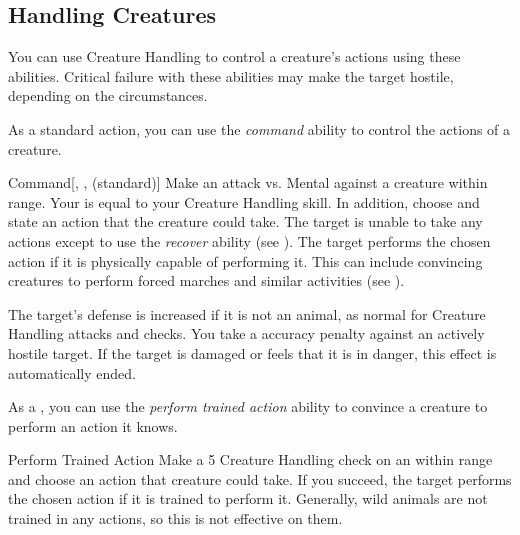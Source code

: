     \subsection{Handling Creatures}
        You can use Creature Handling to control a creature's actions using these abilities.
        Critical failure with these abilities may make the target hostile, depending on the circumstances.

        As a standard action, you can use the \textit{command} ability to control the actions of a creature.

        \begin{freeability}{Command}[, ,  (standard)]
            \label{Command}
            Make an attack vs. Mental against a creature within \rngmed range.
            Your  is equal to your Creature Handling skill.
            In addition, choose and state an action that the creature could take.
            \hit The target is unable to take any actions except to use the \textit{recover} ability (see ).
            \crit The target performs the chosen action if it is physically capable of performing it.
            This can include convincing creatures to perform forced marches and similar activities (see ).
            
            The target's defense is increased if it is not an animal, as normal for Creature Handling attacks and checks.
            You take a  accuracy penalty against an actively hostile target.
            If the target is damaged or feels that it is in danger, this effect is automatically ended.
        \end{freeability}

        As a , you can use the \textit{perform trained action} ability to convince a creature to perform an action it knows.

        \begin{freeability}{Perform Trained Action}
            Make a  5 Creature Handling check on an  within \rnglong range and choose an action that creature could take.
            If you succeed, the target performs the chosen action if it is trained to perform it.
            Generally, wild animals are not trained in any actions, so this is not effective on them.
        \end{freeability}

